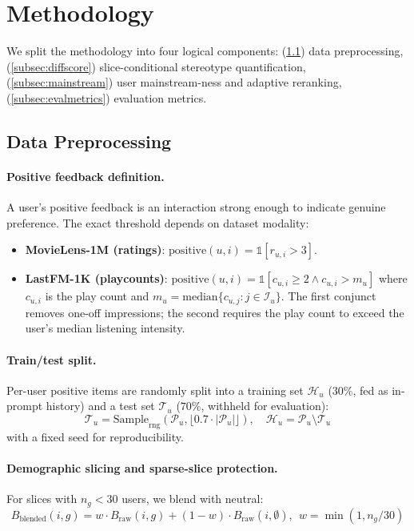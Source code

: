 \section{Methodology}
\label{sec:method}

We split the methodology into four logical components: (\ref{subsec:preprocess}) data preprocessing, (\ref{subsec:diffscore}) slice-conditional stereotype quantification, (\ref{subsec:mainstream}) user mainstream-ness and adaptive reranking, (\ref{subsec:evalmetrics}) evaluation metrics.

\subsection{Data Preprocessing}
\label{subsec:preprocess}

\paragraph{Positive feedback definition.} A user's positive feedback is an interaction strong enough to indicate genuine preference. The exact threshold depends on dataset modality:
\begin{itemize}
\item \textbf{MovieLens-1M (ratings)}: $\text{positive}(u, i) = \mathbb{1}[r_{u,i} > 3]$.
\item \textbf{LastFM-1K (playcounts)}: $\text{positive}(u, i) = \mathbb{1}[c_{u,i} \geq 2 \land c_{u,i} > m_u]$ where $c_{u,i}$ is the play count and $m_u = \text{median}\{c_{u,j} : j \in \mathcal{I}_u\}$. The first conjunct removes one-off impressions; the second requires the play count to exceed the user's median listening intensity.
\end{itemize}

\paragraph{Train/test split.} Per-user positive items are randomly split into a training set $\mathcal{H}_u$ ($30\%$, fed as in-prompt history) and a test set $\mathcal{T}_u$ ($70\%$, withheld for evaluation):
\begin{equation}
\mathcal{T}_u = \text{Sample}_{\text{rng}}(\mathcal{P}_u, \lfloor 0.7 \cdot |\mathcal{P}_u| \rfloor), \quad \mathcal{H}_u = \mathcal{P}_u \setminus \mathcal{T}_u
\end{equation}
with a fixed seed for reproducibility.

\paragraph{Demographic slicing and sparse-slice protection.} For slices with $n_g < 30$ users, we blend with neutral:
\begin{equation}
B_{\text{blended}}(i, g) = w \cdot B_{\text{raw}}(i, g) + (1 - w) \cdot B_{\text{raw}}(i, \emptyset),\ \ w = \min(1, n_g / 30)
\end{equation}

